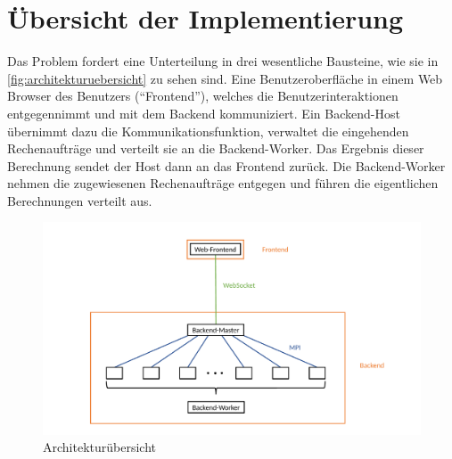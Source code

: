 






\section{Übersicht der Implementierung}

Das Problem fordert eine Unterteilung in drei wesentliche Bausteine, wie sie in \autoref{fig:architekturuebersicht} zu sehen sind.
Eine Benutzeroberfläche in einem Web Browser des Benutzers (“Frontend”), welches die Benutzerinteraktionen entgegennimmt und mit dem Backend kommuniziert.
Ein Backend-Host übernimmt dazu die Kommunikationsfunktion, verwaltet die eingehenden Rechenaufträge und verteilt sie an die Backend-Worker.
Das Ergebnis dieser Berechnung sendet der Host dann an das Frontend zurück.
Die Backend-Worker nehmen die zugewiesenen Rechenaufträge entgegen und führen die eigentlichen Berechnungen verteilt aus.

\begin{figure}
	\centering
	\includegraphics[width=0.98\linewidth]{img/Implementierung/Kommunikation.pdf}
	\caption{Architekturübersicht}
	\label{fig:architekturuebersicht}
\end{figure}

